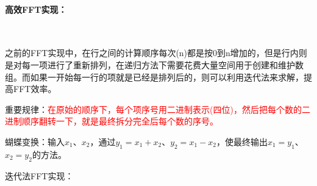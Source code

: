\documentclass[UTF8]{article}%
\begin{document}
\paragraph{高效FFT实现：}~{}

之前的FFT实现中，在行之间的计算顺序每次(n)都是按0到n增加的，但是行内则是对每一项进行了重新排列，在递归方法下需要花费大量空间用于创建和维护数组。而如果一开始每一行的项就是已经是排列后的，则可以利用迭代法来求解，提高FFT效率。

重要规律：\textcolor{red}{在原始的顺序下，每个项序号用二进制表示(四位)，然后把每个数的二进制顺序翻转一下，就是最终拆分完全后每个数的序号。}

蝴蝶变换：输入$x_1$、$x_2$，通过$y_1=x_1+x_2$、$y_2=x_1-x_2$，使最终输出$x_1=y_1$、$x_2=y_2$的方法。

迭代法FFT实现：
\end{document}
